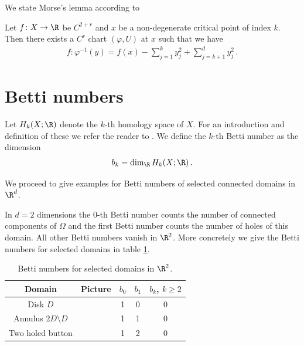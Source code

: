 
We state Morse's lemma according to \cite[p.145]{Hirsch1994}
\begin{lemma}
  Let $f\colon X\to\R$ be $C^{2+r}$ and $x$ be a non-degenerate
  critical point of index $k$. Then there exists a $C^r$ chart $(\varphi,U)$ at $x$
  such that we have
  \begin{align*}
    f\colon\varphi^{-1}(y)=f(x)-\sum_{j=1}^ky_j^2+\sum_{j=k+1}^dy_j^2\,.
  \end{align*}
\end{lemma}


\section{Betti numbers}

Let $H_k(X;\R)$ denote the $k$-th homology space of $X$.
For an introduction and definition of these we refer the reader to \cite[Chapter 2]{Hatcher2002}.
We define the $k$-th Betti number as the dimension
\begin{align}
  b_k=\dim_\R H_k(X;\R)\,.\label{eq:df_bettiNbrs}
\end{align}

We proceed to give examples for Betti numbers of selected connected domains in $\R^d$.
\begin{example}[In flatland]
  In $d=2$ dimensions the $0$-th Betti number counts the number of connected components
  of $\Omega$ and the first Betti number counts the number of holes of this domain.
  All other Betti numbers vanish in $\R^2$.
  More concretely we give the Betti numbers for selected domains in table \ref{tb:n2_domains_bettiNbrs}.
\end{example}

\begin{table}
  \centering
  \renewcommand{\arraystretch}{3}
  \begin{tabular}{c|c|c|c|c}
    Domain & Picture & $b_0$ & $b_1$ & $b_k$, $k\geq2$ \\ \hline
    Disk $D$ & 
    \begin{minipage}{0.1\textwidth}
      \def\svgwidth{\textwidth}
      
    \end{minipage}
    & 1 & 0 & 0 \\
    Annulus $2D\setminus D$ & 
    \begin{minipage}{0.1\textwidth}
      \def\svgwidth{\textwidth}
      
    \end{minipage}
    & 1 & 1 & 0 \\
    Two holed button & 
    \begin{minipage}{0.1\textwidth}
      \def\svgwidth{\textwidth}
      
    \end{minipage}
    & 1 & 2 & 0 \\
  \end{tabular}
  \caption{Betti numbers for selected domains in $\R^2$.}
  \label{tb:n2_domains_bettiNbrs}
\end{table}

